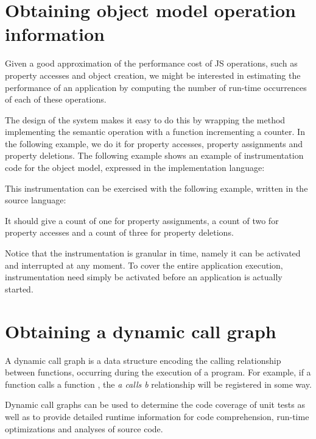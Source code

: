 \section{Obtaining object model operation information}
\label{sec:ObjectModelInstrumentation}

Given a good approximation of the performance cost of JS operations, such as
property accesses and object creation, we might be interested in estimating the
performance of an application by computing the number of run-time occurrences of
each of these operations.

The design of the system makes it easy to do this by wrapping the method
implementing the semantic operation with a function incrementing a counter.  In
the following example, we do it for property accesses, property assignments
and property deletions. The following example shows an example of
instrumentation code for the object model, expressed in the
implementation language:


This instrumentation can be exercised with the following example, written in
the source language:


It should give a count of one for property assignments, a count of two for
property accesses and a count of three for property deletions.

Notice that the instrumentation is granular in time, namely it can be activated
and interrupted at any moment.  To cover the entire application execution,
instrumentation need simply be activated before an application is actually
started. 

\section{Obtaining a dynamic call graph}

A dynamic call graph is a data structure encoding the calling relationship
between functions, occurring during the execution of a program. For example, if
a function  calls a function , the \textit{a calls b} relationship
will be registered in some way. 

Dynamic call graphs can be used to determine the code coverage of unit tests as
well as to provide detailed runtime information for code comprehension,
run-time optimizations and analyses of source code. 

